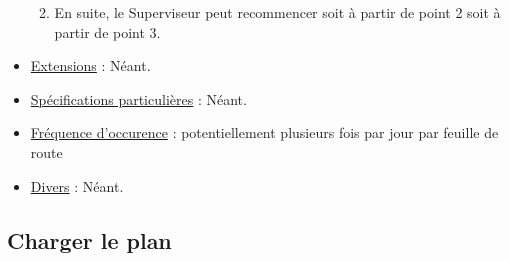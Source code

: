 \documentclass[a4paper]{article}
\begin{document}
\begin{itemize}[label = \textbullet, font = \color{orange}]
\begin{enumerate}
\begin{itemize}
        \end{itemize}
        \item En suite, le Superviseur peut recommencer soit à partir de point 2 soit à partir de point 3.
    \end{enumerate}
    \item \underline{Extensions} : Néant.
    \item \underline{Spécifications particulières} : Néant.
    \item \underline{Fréquence d'occurence} : potentiellement plusieurs fois par jour par feuille de route
    \item \underline{Divers} : Néant.
\end{itemize}

\subsection{Charger le plan}
\end{document}
